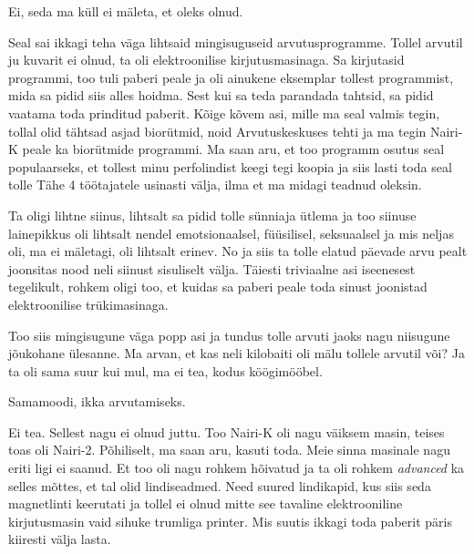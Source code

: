 Ei, seda ma küll ei mäleta, et oleks olnud.


Seal sai ikkagi teha väga lihtsaid mingisuguseid arvutusprogramme. Tollel arvutil ju kuvarit ei olnud, ta oli elektroonilise kirjutusmasinaga. Sa kirjutasid programmi, too tuli paberi peale ja  oli ainukene eksemplar tollest programmist, mida sa pidid siis alles hoidma. Sest kui sa teda parandada tahtsid, sa pidid vaatama toda prinditud paberit. Kõige kõvem asi, mille ma seal valmis tegin, tollal olid tähtsad asjad biorütmid, noid Arvutuskeskuses tehti ja  ma tegin Nairi-K peale ka  biorütmide programmi. Ma saan aru, et too programm osutus seal populaarseks, et tollest minu perfolindist keegi tegi koopia ja siis lasti toda seal tolle Tähe 4 töötajatele usinasti välja, ilma et ma midagi teadnud oleksin.


Ta oligi lihtne siinus,  lihtsalt sa pidid tolle sünniaja ütlema ja too siinuse lainepikkus oli lihtsalt nendel emotsionaalsel, füüsilisel,  seksuaalsel ja mis neljas oli, ma ei mäletagi, oli lihtsalt erinev.  No ja siis ta tolle elatud päevade arvu pealt joonsitas nood neli siinust sisuliselt välja. Täiesti triviaalne asi iseenesest tegelikult, rohkem oligi too, et kuidas sa paberi peale toda sinust joonistad elektroonilise trükimasinaga. 


Too siis mingisugune väga popp asi ja tundus tolle arvuti jaoks nagu niisugune jõukohane ülesanne. Ma arvan, et kas neli kilobaiti oli mälu tollele arvutil või? Ja ta oli sama suur kui mul, ma ei tea, kodus köögimööbel.


Samamoodi, ikka arvutamiseks.


Ei tea. Sellest nagu ei olnud juttu. Too Nairi-K oli nagu väiksem masin, teises toas oli Nairi-2. Põhiliselt, ma saan aru, kasuti toda. Meie sinna masinale nagu eriti ligi ei saanud. Et too oli nagu rohkem hõivatud ja ta oli rohkem \emph{advanced} ka selles mõttes, et tal olid lindiseadmed. Need suured lindikapid, kus siis seda magnetlinti keerutati ja tollel ei olnud mitte see tavaline elektrooniline kirjutusmasin vaid sihuke trumliga printer. Mis suutis ikkagi toda paberit  päris kiiresti välja lasta.

